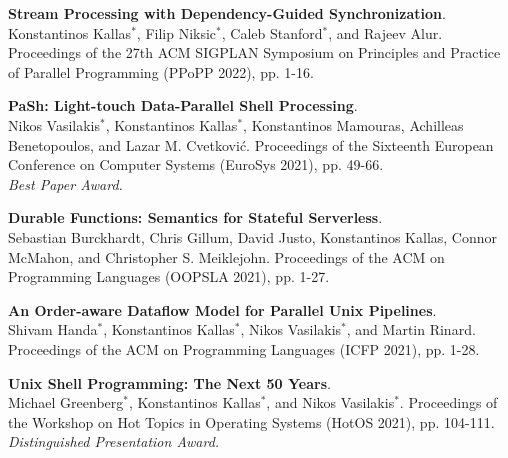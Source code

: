 \begin{minipage}{\textwidth}
\textbf{Stream Processing with Dependency-Guided Synchronization}. \\
Konstantinos Kallas$^*$, Filip Niksic$^*$, Caleb Stanford$^*$, and Rajeev Alur.
Proceedings of the 27th ACM SIGPLAN Symposium on Principles and Practice of Parallel Programming (PPoPP 2022), pp. 1-16. \\
\end{minipage}

\begin{minipage}{\textwidth}
\textbf{PaSh: Light-touch Data-Parallel Shell Processing}. \\
Nikos Vasilakis$^*$, Konstantinos Kallas$^*$, Konstantinos Mamouras, Achilleas Benetopoulos, and Lazar M. Cvetković.
Proceedings of the Sixteenth European Conference on Computer Systems (EuroSys 2021), pp. 49-66.\\
\emph{Best Paper Award.}
\end{minipage}

\begin{minipage}{\textwidth}
\textbf{Durable Functions: Semantics for Stateful Serverless}. \\
Sebastian Burckhardt, Chris Gillum, David Justo, Konstantinos Kallas, Connor McMahon, and Christopher S. Meiklejohn.
Proceedings of the ACM on Programming Languages (OOPSLA 2021), pp. 1-27. \\
\end{minipage}

\begin{minipage}{\textwidth}
\textbf{An Order-aware Dataflow Model for Parallel Unix Pipelines}. \\
Shivam Handa$^*$, Konstantinos Kallas$^*$, Nikos Vasilakis$^*$, and Martin Rinard.
Proceedings of the ACM on Programming Languages (ICFP 2021), pp. 1-28. \\
\end{minipage}    

\begin{minipage}{\textwidth}
\textbf{Unix Shell Programming: The Next 50 Years}. \\
Michael Greenberg$^*$, Konstantinos Kallas$^*$, and Nikos Vasilakis$^*$.
Proceedings of the Workshop on Hot Topics in Operating Systems (HotOS 2021), pp. 104-111. \\
\emph{Distinguished Presentation Award.}
\end{minipage}

